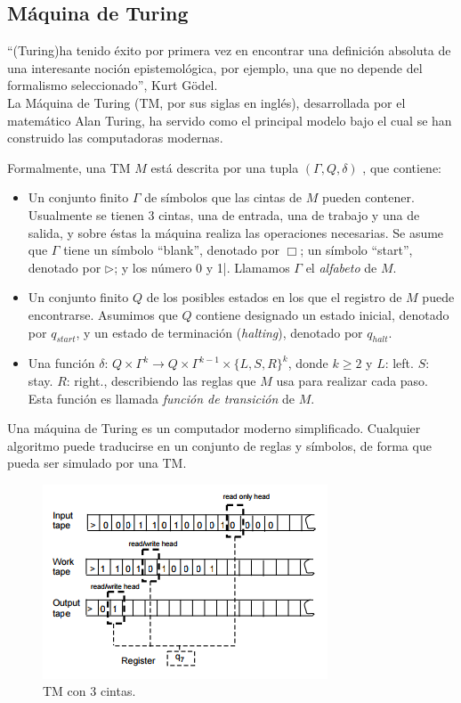 \subsection{Máquina de Turing}

``(Turing)ha tenido éxito por primera vez en encontrar una definición absoluta de una interesante noción epistemológica, por ejemplo, una que no depende del formalismo seleccionado'', Kurt Gödel. \\

La Máquina de Turing (TM, por sus siglas en inglés), desarrollada por el matemático Alan Turing, ha servido como el principal modelo bajo el cual se han construido las computadoras modernas.

\begin{defn}\end{defn}

Formalmente, una TM $M$ está descrita por una tupla $(\Gamma, Q, \delta)$  \cite{Arora2009}, que contiene:

\begin{itemize}
\item Un conjunto finito $\Gamma$ de símbolos que las cintas de $M$ pueden contener. Usualmente se tienen 3 cintas, una de entrada, una de trabajo y una de salida, y sobre éstas la máquina realiza las operaciones necesarias. Se asume que $\Gamma$ tiene un símbolo ``blank'', denotado por $\Box$; un símbolo ``start'', denotado por $\rhd$; y los número 0 y 1|. Llamamos $\Gamma$ el \emph{alfabeto} de $M$.

\item Un conjunto finito $Q$ de los posibles estados en los que el registro de $M$ puede encontrarse. Asumimos que $Q$ contiene designado un estado inicial, denotado por $q_{start}$, y un estado de terminación (\emph{halting}), denotado por $q_{halt}$.

\item Una función $\delta$: $Q \times \Gamma^k \to Q \times \Gamma^{k-1} \times \{L,S,R\}^k$, donde $k \geq 2$ y $L$: left. $S$: stay. $R$: right., describiendo las reglas que $M$ usa para realizar cada paso. Esta función es llamada \emph{función de transición} de $M$. 
\end{itemize}

Una máquina de Turing es un computador moderno simplificado. Cualquier algoritmo puede traducirse en un conjunto de reglas y símbolos, de forma que pueda ser simulado por una TM.

\begin{figure}
	\centering
	\includegraphics{images/tm}
	\caption{TM con 3 cintas.}
\end{figure}

